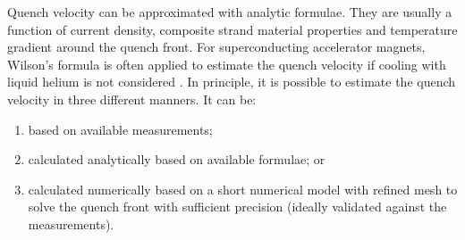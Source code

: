 Quench velocity can be approximated with analytic formulae. They are usually a function of current density, composite strand material properties and temperature gradient around the quench front. For superconducting accelerator magnets, Wilson's formula is often applied to estimate the quench velocity if cooling with liquid helium is not considered \cite[p.~206]{wilson1987superconducting}. In principle, it is possible to estimate the quench velocity in three different manners. It can be:
\begin{enumerate}
\item based on available measurements;
\item calculated analytically based on available formulae; or
\item calculated numerically based on a short numerical model with refined mesh to solve the quench front with sufficient precision (ideally validated against the measurements).
\end{enumerate}